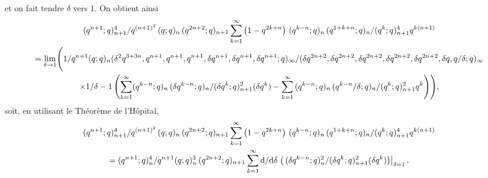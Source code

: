 \documentclass[12pt]{amsart}
\newcommand{\dd}{\textup{d}}
\newcommand{\de}{\delta}
\theoremstyle{remark}
\numberwithin{equation}{section}
\begin{document}
et on fait tendre $\de$ vers $1$. 
On obtient ainsi
\begin{multline*}
 \frac{({\let \over / \def\frac#1#2{#1 / #2} q^ {n+1}}; q)
         _{n+1} ^4 }{q^
       {{\left( n+1 \right) }^2}\,
      ({\let \over / \def\frac#1#2{#1 / #2} q}; q) _{n} \,
      ({\let \over / \def\frac#1#2{#1 / #2} q^ {2n+2}}; q)
       _{n+1} } \sum _{k=1} ^ {\infty} \frac{\left( 1 - q^ {2 k + n} \right)
       \,({\let \over / \def\frac#1#2{#1 / #2} q^ {k - n}}; q)
       _{n} \,({\let \over / \def\frac#1#2{#1 / #2} q^ {1 +
       k + n}}; q) _{n} }{({\let \over / \def\frac#1#2{#1 / #2}
       q^ k}; q) _{n+1} ^ 4}q^
       {k \left( n+1 \right) } \\
= \lim_{\de\to1}\Biggl(\frac{1
      }{q^{n+1}
        ({\let \over / \def\frac#1#2{#1 / #2} q}; q) _{n} }
 \frac {(\let \over / \def\frac#1#2{#1 / #2}
       {\de}^ 2 q^ {3 + 3 n}, q^ {n+1},
       q^ {n+1}, q^ {n+1}, \de q^ {
       n+1}, \de q^ {n+1}, \de q^ {
       n+1} ;q) _\infty} {(\let \over / \def\frac#1#2{#1 / #2}
       \de q^ {2n+2}, \de q^ {
       2 n+2}, \de q^ {2n+2},
       \de q^ {2n+2}, \de q^ {
       2 n+2}, \de q, \frac{q}{\de} ;q) _\infty}  \\
\times
\frac {1} {\de-1} \left( 
         \sum _{k=1} ^ {\infty} \frac{ ({\let \over /
          \def\frac#1#2{#1 / #2} q^ {k - n}}; q) _{n}
          \,({\let \over / \def\frac#1#2{#1 / #2}
          \de q^ {k - n}}; q) _{n} }{({\let \over /
          \def\frac#1#2{#1 / #2} \de q^ k}; q)
          _{n+1} ^ 2}(\de q^ k) -\sum _{k=1} ^ {\infty} \frac{\,({\let \over
         / \def\frac#1#2{#1 / #2} q^ {k - n}}; q) _{n}
         \,({\let \over / \def\frac#1#2{#1 / #2} \frac{q^ {k -
         n}}{\de}}; q) _{n} }{({\let \over /
         \def\frac#1#2{#1 / #2} q^ k}; q) _{n+1}
         ^ 2} q^ k \right)\Biggr),
\end{multline*}
soit, en utilisant le Th{\'e}or{\`e}me de l'H{\^o}pital, 
\begin{multline*}
 \frac{({\let \over / \def\frac#1#2{#1 / #2} q^ {n+1}}; q)
         _{n+1} ^4 }{q^
       {{\left( n+1 \right) }^2}\,
      ({\let \over / \def\frac#1#2{#1 / #2} q}; q) _{n} \,
      ({\let \over / \def\frac#1#2{#1 / #2} q^ {2n+2}}; q)
       _{n+1} } \sum _{k=1} ^ {\infty} \frac{\left( 1 - q^ {2 k + n} \right)
       \,({\let \over / \def\frac#1#2{#1 / #2} q^ {k - n}}; q)
       _{n} \,({\let \over / \def\frac#1#2{#1 / #2} q^ {1 +
       k + n}}; q) _{n} }{({\let \over / \def\frac#1#2{#1 / #2}
       q^ k}; q) _{n+1} ^ 4}q^
       {k \left( n+1 \right) } \\
= \frac{(q^{n+1};q)_n^4
      }{q^{n+1}
        ({\let \over / \def\frac#1#2{#1 / #2} q}; q) _{n} ^3\,
     (q^ {2n+2};q)_{n+1}}
         \sum _{k=1} ^ {\infty} \frac {\dd} {\dd\de}\left.\left(\frac{ 
          \,({\let \over / \def\frac#1#2{#1 / #2}
          \de q^ {k - n}}; q) _{n} ^2}{({\let \over /
          \def\frac#1#2{#1 / #2} \de q^ k}; q)
          _{n+1} ^ 2}(\de q^ k)  \right)\right\vert_{\de=1}.
\end{multline*}
\end{document}
